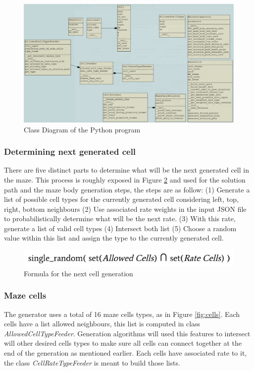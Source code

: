 \documentclass[review]{elsarticle}
\begin{document}
\begin{figure}
	\includegraphics[width=\linewidth]{class_diagram.png}
	\caption{Class Diagram of the Python program}
	\label{fig:class_diagram}
\end{figure}

\subsubsection{Determining next generated cell}
There are five distinct parts to determine what will be the next generated cell in the maze. This process is roughly exposed in Figure \ref{fig:next_decision} and used for the solution path and the maze body generation steps, the steps are as follow: (1) Generate a list of possible cell types for the currently generated cell considering left, top, right, bottom neighbours (2) Use associated rate weights in the input JSON file to probabilistically determine what will be the next rate. (3) With this rate, generate a list of valid cell types (4) Intersect both list (5) Choose a random value within this list and assign the type to the currently generated cell.

\begin{figure}
	\includegraphics[width=\linewidth]{next_decision_formula.png}
	\caption{Formula for the next cell generation}
	\label{fig:next_decision}
\end{figure}

\subsubsection{Maze cells}
The generator uses a total of 16 maze cells types, as in Figure \ref{fig:cells}. Each cells have a list allowed neighbours, this list is computed in class \textit{AllowedCellTypeFeeder}. Generation algorithms will used this features to intersect will other desired cells types to make sure all cells can connect together at the end of the generation as mentioned earlier. Each cells have associated rate to it, the class \textit{CellRateTypeFeeder} is meant to build those lists.
\end{document}
